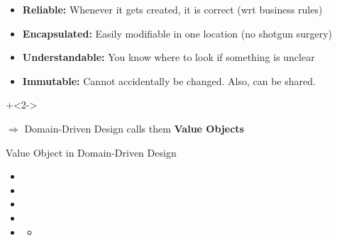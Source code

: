 \begin{frame}[fragile]{\de{}\en{}}

\begin{itemize}
\item \textbf{Reliable:} Whenever it gets created, it is correct (wrt business rules)
\vspace{1em}
\item \textbf{Encapsulated:} Easily modifiable in one location (no shotgun surgery)
\vspace{1em}
\item \textbf{Understandable:} You know where to look if something is unclear
\vspace{1em}
\item \textbf{Immutable:} Cannot accidentally be changed. Also, can be shared.
\end{itemize}

\onslide+<2->

\vspace{2.5em}
{
\Large
$\Longrightarrow$ Domain-Driven Design calls them \textbf{Value Objects}
}

\end{frame}

\begin{frame}{Value Object in Domain-Driven Design}
\begin{itemize}
\item {}
\item {}
\item {}
\item {}
\item {}
\begin{itemize}
\item {}
\end{itemize}
\end{itemize}
\end{frame}

